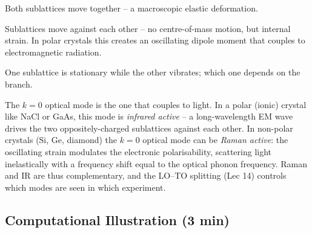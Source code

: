 \documentclass[11pt,a4paper]{article}
\begin{document}
\begin{physbox}
Both sublattices move together -- a macroscopic elastic deformation.
\end{physbox}
\begin{physbox}
Sublattices move against each other -- no centre-of-mass motion, but internal
strain. In polar crystals this creates an oscillating dipole moment that couples to
electromagnetic radiation.
\end{physbox}
\begin{physbox}[Zone boundary, $k=\pi/a$]
One sublattice is stationary while the other vibrates; which one depends on the
branch.
\end{physbox}

\begin{expbox}
The $k=0$ optical mode is the one that couples to light. In a polar (ionic)
crystal like NaCl or GaAs, this mode is \emph{infrared active} -- a long-wavelength
EM wave drives the two oppositely-charged sublattices against each other. In
non-polar crystals (Si, Ge, diamond) the $k=0$ optical mode can be \emph{Raman
active}: the oscillating strain modulates the electronic polarisability, scattering
light inelastically with a frequency shift equal to the optical phonon frequency.
Raman and IR are thus complementary, and the LO--TO splitting (Lec 14) controls
which modes are seen in which experiment.
\end{expbox}

\subsection{Computational Illustration \hfill \small(3 min)}
\end{document}

